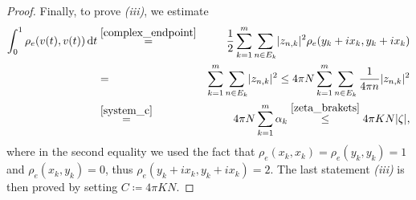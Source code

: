 \documentclass[a4paper,11pt,reqno]{amsart}
\theoremstyle{plain}
\theoremstyle{definition}
\newcommand{\id}{e}
\newcommand{\de}{\mathrm{d}}
\newcommand{\coloneq}{\coloneqq}
\begin{document}
\begin{proof}
Finally, to prove \emph{(iii)}, we estimate
\begin{eqnarray*}
 \int^1_0 \rho_\id(v(t),v(t))\, \de t &\stackrel{\eqref{complex_endpoint}}{=}& \frac{1}{2} \sum_{k=1}^m \sum_{n \in E_k} \lvert z_{n,k} \rvert^2 \rho_\id(y_k+ix_k,y_k+ix_k) \\
 &=& \sum_{k=1}^m \sum_{n \in E_k} \lvert z_{n,k} \rvert^2 \le 4 \pi N \sum_{k=1}^m \sum_{n \in E_k} \frac{1}{4\pi n}\lvert z_{n,k} \rvert^2 \\
 &\stackrel{\eqref{system_c}}{=}& 4 \pi N \sum_{k=1}^m \alpha_k \stackrel{\eqref{zeta_brakets}}{\le} 4\pi KN \lvert \zeta \rvert,
\end{eqnarray*}
where in the second equality we used the fact that $\rho_\id(x_k,x_k)=\rho_\id(y_k,y_k)=1$ and $\rho_\id(x_k,y_k)=0$, thus $\rho_\id(y_k+ix_k,y_k+ix_k)=2$. The last statement \emph{(iii)} is then proved by setting $C \coloneq 4\pi KN$. \qedhere



\end{proof}
\end{document}
